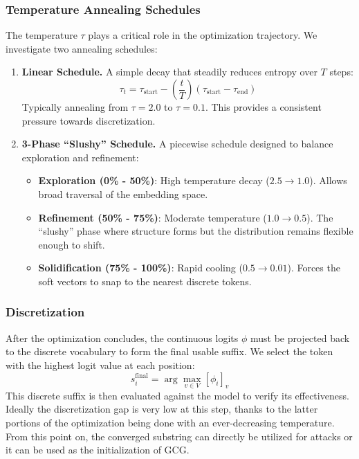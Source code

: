 \documentclass[letterpaper]{article} %
\begin{document}
\subsubsection{Temperature Annealing Schedules}
The temperature $\tau$ plays a critical role in the optimization trajectory. We investigate two annealing schedules:
\begin{enumerate}
    \item \textbf{Linear Schedule.} A simple decay that steadily reduces entropy over $T$ steps:
    \begin{equation}
        \tau_t = \tau_{\text{start}} - \left(\frac{t}{T}\right)(\tau_{\text{start}} - \tau_{\text{end}})
    \end{equation}
    Typically annealing from $\tau=2.0$ to $\tau=0.1$. This provides a consistent pressure towards discretization.

    \item \textbf{3-Phase ``Slushy'' Schedule.} A piecewise schedule designed to balance exploration and refinement:
    \begin{itemize}
        \item \textbf{Exploration (0\% - 50\%)}: High temperature decay ($2.5 \to 1.0$). Allows broad traversal of the embedding space.
        \item \textbf{Refinement (50\% - 75\%)}: Moderate temperature ($1.0 \to 0.5$). The ``slushy'' phase where structure forms but the distribution remains flexible enough to shift.
        \item \textbf{Solidification (75\% - 100\%)}: Rapid cooling ($0.5 \to 0.01$). Forces the soft vectors to snap to the nearest discrete tokens.
    \end{itemize}
\end{enumerate}


\subsubsection{Discretization}
After the optimization concludes, the continuous logits $\phi$ must be projected back to the discrete vocabulary to form the final usable suffix. We select the token with the highest logit value at each position:
\begin{equation}
    s_i^{\text{final}} = \arg\max_{v \in V} [\phi_i]_v
\end{equation}
This discrete suffix is then evaluated against the model to verify its effectiveness. Ideally the discretization gap is very low at this step, thanks to the latter portions of the optimization being done with an ever-decreasing temperature. 
From this point on, the converged substring can directly be utilized for attacks or it can be used as the initialization of GCG.
\end{document}
